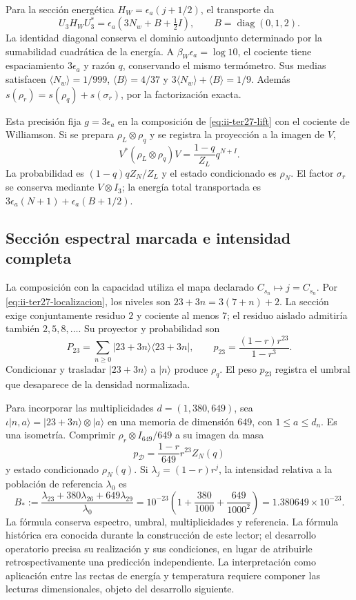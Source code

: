 Para la sección energética $H_W=\epsilon_a(j+1/2)$, el transporte da
\[
 U_3H_WU_3^*=\epsilon_a(3N_w+B+\tfrac12 I),
 \qquad B=\operatorname{diag}(0,1,2).
\]
La identidad diagonal conserva el dominio autoadjunto determinado por
la sumabilidad cuadrática de la energía. A $\beta_W\epsilon_a=\log10$,
el cociente tiene espaciamiento $3\epsilon_a$ y razón $q$, conservando
el mismo termómetro. Sus medias satisfacen
$\langle N_w\rangle=1/999$, $\langle B\rangle=4/37$ y
$3\langle N_w\rangle+\langle B\rangle=1/9$.
Además $s(\rho_r)=s(\rho_q)+s(\sigma_r)$, por la factorización exacta.

Esta precisión fija $g=3\epsilon_a$ en la composición de
\eqref{eq:ii-ter27-lift} con el cociente de Williamson. Si se prepara
$\rho_L\otimes\rho_q$ y se registra la proyección a la imagen de $V$,
\[
 V^*(\rho_L\otimes\rho_q)V=\frac{1-q}{Z_L}q^{N+I}.
\]
La probabilidad es $(1-q)qZ_N/Z_L$ y el estado condicionado es $\rho_N$.
El factor $\sigma_r$ se conserva mediante $V\otimes I_3$; la energía
total transportada es
$3\epsilon_a(N+1)+\epsilon_a(B+1/2)$.

\subsection{Sección espectral marcada e intensidad completa}
\label{sec:ii-ter27-marcador}

La composición con la capacidad utiliza el mapa declarado
$C_{s_n}\mapsto j=C_{s_n}$. Por \eqref{eq:ii-ter27-localizacion},
los niveles son $23+3n=3(7+n)+2$. La sección exige conjuntamente
residuo $2$ y cociente al menos $7$; el residuo aislado admitiría también
$2,5,8,\ldots$. Su proyector y probabilidad son
\[
 P_{23}=\sum_{n\geq0}|23+3n\rangle\langle23+3n|,
 \qquad p_{23}=\frac{(1-r)r^{23}}{1-r^3}.
\]
Condicionar y trasladar $|23+3n\rangle$ a $|n\rangle$ produce $\rho_q$.
El peso $p_{23}$ registra el umbral que desaparece de la densidad normalizada.

Para incorporar las multiplicidades $d=(1,380,649)$, sea
$\iota|n,a\rangle=|23+3n\rangle\otimes|a\rangle$ en una memoria
de dimensión $649$, con $1\leq a\leq d_n$. Es una isometría.
Comprimir $\rho_r\otimes I_{649}/649$ a su imagen da masa
\[
 p_{\mathcal D}=\frac{1-r}{649}r^{23}Z_N(q)
\]
y estado condicionado $\rho_N(q)$. Si $\lambda_j=(1-r)r^j$,
la intensidad relativa a la población de referencia $\lambda_0$ es
\begin{equation}
 B_*:=\frac{\lambda_{23}+380\lambda_{26}+649\lambda_{29}}{\lambda_0}
 =10^{-23}\left(1+\frac{380}{1000}+\frac{649}{1000^2}\right)
 =1.380649\times10^{-23}.
 \label{eq:ii-ter27-intensidad}
\end{equation}
La fórmula conserva espectro, umbral, multiplicidades y referencia.
La fórmula histórica era conocida durante la construcción de este lector;
el desarrollo operatorio precisa su realización y sus condiciones, en
lugar de atribuirle retrospectivamente una predicción independiente.
La interpretación como aplicación entre las rectas de energía y temperatura
requiere componer las lecturas dimensionales, objeto del desarrollo siguiente.

